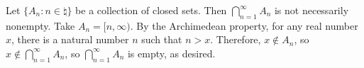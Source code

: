 Let $\{A_n : n \in \natural\}$ be a collection of closed sets.
Then $\bigcap _{n=1} ^\infty A_n$ is not necessarily nonempty.
Take $A_n = [n, \infty)$.
By the Archimedean property, for any real number $x$,
there is a natural number $n$ such that $n > x$.
Therefore, $x \notin A_n$, so $x \notin \bigcap _{n=1} ^\infty A_n$,
so $\bigcap _{n=1} ^\infty A_n$ is empty, as desired.
\bye
